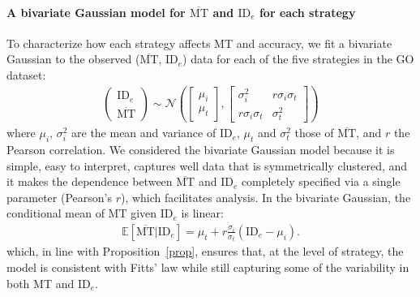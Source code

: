 \documentclass[acmlarge, manuscript,review]{acmart}
\newcommand{\mmt}{\ensuremath{\overline{\mt}}\xspace}
\newcommand{\mt}{\ensuremath{{\text{MT}}}\xspace}
\newcommand{\ide}{\ensuremath{{\text{ID}_e}}\xspace}
\begin{document}
\paragraph{A bivariate Gaussian model for \mmt and \ide for each strategy}
To characterize how each strategy affects MT and accuracy, we fit a bivariate Gaussian to the observed (\mmt, \ide) data for each of the five strategies in the GO dataset:
\begin{align}
	\begin{pmatrix}
		\ide \\
		\mmt
	\end{pmatrix} \sim \mathcal{N} \left( \begin{bmatrix}
			                                      \mu_i \\
			                                      \mu_t
		                                      \end{bmatrix}, \begin{bmatrix}
			                                                     \sigma^2_i          & r \sigma_i \sigma_t \\
			                                                     r \sigma_i \sigma_t & \sigma_t^2
		                                                     \end{bmatrix} \right) \label{eq:gaussian_ide_mt}
\end{align}
where $\mu_i$, $\sigma_i^2$ are the mean and variance of \ide, $\mu_t$ and $\sigma_t^2$ those of \mmt, and $r$ the Pearson correlation. 
We considered the bivariate Gaussian model because it is simple, easy to interpret, captures well data that is symmetrically clustered, and it makes the dependence between \mmt and \ide completely specified via a single parameter (Pearson's $r$), which facilitates analysis.
In the bivariate Gaussian, the conditional mean of MT given \ide is linear:
\begin{align}
	\mathbb{E}[\mmt | \ide] = \mu_t + r \frac{\sigma_i}{\sigma_t}(\ide - \mu_i).  \label{eq:mmt_ide_gauss}
\end{align}
which, in line with Proposition~\ref{prop}, ensures that, at the level of strategy, the model is consistent with Fitts' law while still capturing some of the variability in both MT and \ide.
\end{document}
